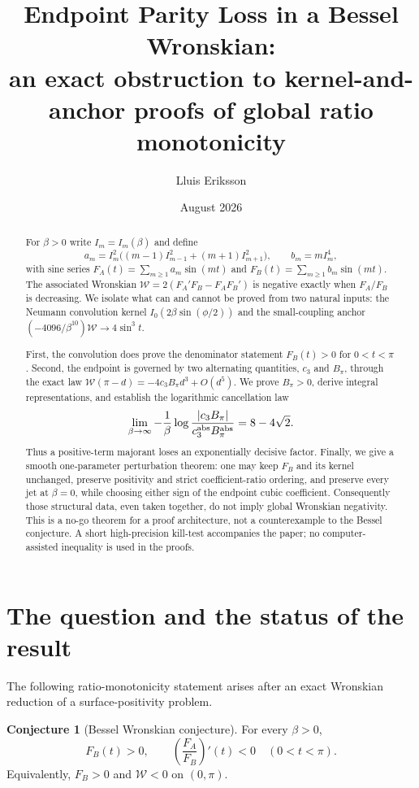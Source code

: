 \documentclass[11pt]{article}
\title{Endpoint Parity Loss in a Bessel Wronskian:\\
\large an exact obstruction to kernel-and-anchor proofs of global ratio monotonicity}
\author{Lluis Eriksson}
\date{August 2026}
\theoremstyle{definition}
\newtheorem{conjecture}[theorem]{Conjecture}
\theoremstyle{remark}
\newcommand{\FA}{F_{\!A}}
\newcommand{\FB}{F_{\!B}}
\newcommand{\W}{\mathcal W}
\begin{document}
\maketitle

\begin{abstract}
For $\beta>0$ write $I_m=I_m(\beta)$ and define
\[
 a_m=I_m^2\bigl((m-1)I_{m-1}^2+(m+1)I_{m+1}^2\bigr),
 \qquad b_m=mI_m^4,
\]
with sine series $\FA(t)=\sum_{m\geq1}a_m\sin(mt)$ and
$\FB(t)=\sum_{m\geq1}b_m\sin(mt)$.  The associated Wronskian
$\W=2(\FA'\FB-\FA\FB')$ is negative exactly when $\FA/\FB$ is
decreasing.  We isolate what can and cannot be proved from two natural
inputs: the Neumann convolution kernel
$I_0(2\beta\sin(\phi/2))$ and the small-coupling anchor
$(-4096/\beta^{10})\W\to4\sin^3t$.

First, the convolution does prove the denominator statement
$\FB(t)>0$ for $0<t<\pi$.  Second, the endpoint is governed by two
alternating quantities, $c_3$ and $B_\pi$, through the exact law
$\W(\pi-d)=-4c_3B_\pi d^3+O(d^5)$.  We prove $B_\pi>0$, derive integral
representations, and establish the logarithmic cancellation law
\[
 \lim_{\beta\to\infty}-\frac{1}{\beta}\log
 \frac{|c_3B_\pi|}{c_3^{\rm abs}B_\pi^{\rm abs}}
 =8-4\sqrt2.
\]
Thus a positive-term majorant loses an exponentially decisive factor.
Finally, we give a smooth one-parameter perturbation theorem: one may keep
$\FB$ and its kernel unchanged, preserve positivity and strict coefficient-ratio
ordering, and preserve every jet at $\beta=0$, while choosing either sign of
the endpoint cubic coefficient.  Consequently those structural data, even
taken together, do not imply global Wronskian negativity.  This is a no-go
theorem for a proof architecture, not a counterexample to the Bessel
conjecture.  A short high-precision kill-test accompanies the paper; no
computer-assisted inequality is used in the proofs.
\end{abstract}

\section{The question and the status of the result}

The following ratio-monotonicity statement arises after an exact
Wronskian reduction of a surface-positivity problem.

\begin{conjecture}[Bessel Wronskian conjecture]\label{conj:main}
For every $\beta>0$,
\[
 \FB(t)>0,
 \qquad
 \left(\frac{\FA}{\FB}\right)'(t)<0
 \quad (0<t<\pi).
\]
Equivalently, $\FB>0$ and $\W<0$ on $(0,\pi)$.
\end{conjecture}
\end{document}
